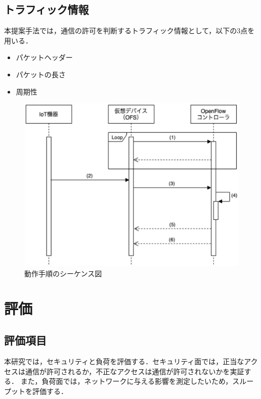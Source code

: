 \documentclass[a4paper,10pt,twocolumn,uplatex]{jsarticle}
\begin{document}
\subsection{トラフィック情報}
本提案手法では，通信の許可を判断するトラフィック情報として，以下の3点を用いる．

\begin{itemize}
  \item パケットヘッダー
  \item パケットの長さ
  \item 周期性
\end{itemize}

\begin{figure}[!tb]
  \centering
  \includegraphics[width=\linewidth]{img/sequence.eps}
  \caption{動作手順のシーケンス図}
  \label{fig:sequence}
\end{figure}

\section{評価}
\subsection{評価項目}
本研究では，セキュリティと負荷を評価する．セキュリティ面では，正当なアクセスは通信が許可されるか，不正なアクセスは通信が許可されないかを実証する．
また，負荷面では，ネットワークに与える影響を測定したいため，スループットを評価する．
\end{document}
